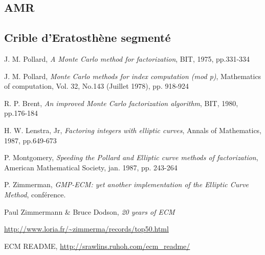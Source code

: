 \documentclass[11pt,a4paper]{article}
\begin{document}
\subsection{AMR}


\subsection{Crible d'Eratosthène segmenté}



\begin{thebibliography}{9}
J. M. Pollard, \emph{A Monte Carlo method for factorization}, BIT, 1975, pp.331-334

J. M. Pollard, \emph{Monte Carlo methods for index computation (mod p)}, Mathematics of computation, Vol. 32, No.143 (Juillet 1978), pp. 918-924

R. P. Brent, \emph{An improved Monte Carlo factorization algorithm}, BIT, 1980, pp.176-184

H. W. Lenstra, Jr, \emph{Factoring integers with elliptic curves}, Annals of Mathematics, 1987, pp.649-673

P. Montgomery, \emph{Speeding the Pollard and Elliptic curve methods of factorization}, American Mathematical Society, jan. 1987, pp. 243-264

P. Zimmerman, \emph{\textsf{GMP-ECM}: yet another implementation of the Elliptic Curve Method}, conférence.

Paul Zimmermann \& Bruce Dodson, \emph{20 years of ECM}

\url{http://www.loria.fr/~zimmerma/records/top50.html}

ECM README, \url{http://srawlins.ruhoh.com/ecm_readme/}

\end{thebibliography}
\end{document}

